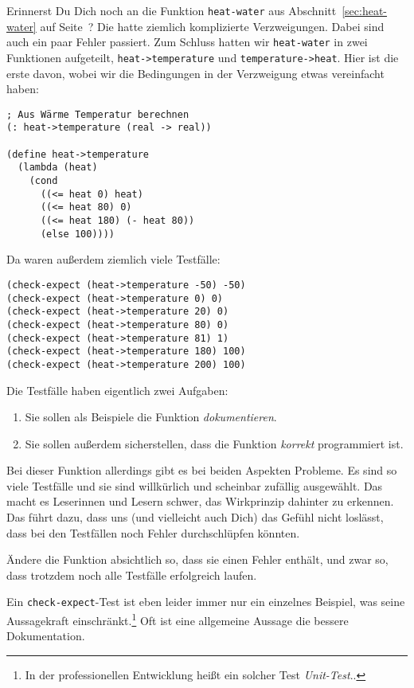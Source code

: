 Erinnerst Du Dich noch an die Funktion \lstinline{heat-water} aus
Abschnitt~\ref{sec:heat-water} auf Seite~\pageref{sec:heat-water}?
Die hatte ziemlich komplizierte Verzweigungen.  Dabei sind auch ein
paar Fehler passiert.  Zum Schluss hatten wir \lstinline{heat-water}
in zwei Funktionen aufgeteilt, \lstinline{heat->temperature} und
\lstinline{temperature->heat}.  Hier ist die erste davon, wobei wir
die Bedingungen in der Verzweigung etwas vereinfacht haben:
%
\begin{lstlisting}
; Aus Wärme Temperatur berechnen
(: heat->temperature (real -> real))

(define heat->temperature
  (lambda (heat)
    (cond
      ((<= heat 0) heat)
      ((<= heat 80) 0)
      ((<= heat 180) (- heat 80))
      (else 100))))
\end{lstlisting}
%
Da waren außerdem ziemlich viele Testfälle:
%
\begin{lstlisting}
(check-expect (heat->temperature -50) -50)
(check-expect (heat->temperature 0) 0)
(check-expect (heat->temperature 20) 0)
(check-expect (heat->temperature 80) 0)
(check-expect (heat->temperature 81) 1)
(check-expect (heat->temperature 180) 100)
(check-expect (heat->temperature 200) 100)                                            
\end{lstlisting}
%
Die Testfälle haben eigentlich zwei Aufgaben:
%
\begin{enumerate}
\item Sie sollen als Beispiele die Funktion \emph{dokumentieren}.
\item Sie sollen außerdem sicherstellen, dass die Funktion
  \emph{korrekt} programmiert ist.
\end{enumerate}
%
Bei dieser Funktion allerdings gibt es bei beiden Aspekten Probleme.
Es sind so viele Testfälle und sie sind willkürlich und scheinbar
zufällig ausgewählt.  Das macht es Leserinnen und Lesern schwer, das
Wirkprinzip dahinter zu erkennen. Das führt dazu, dass uns (und
vielleicht auch Dich) das Gefühl nicht loslässt, dass bei den
Testfällen noch Fehler durchschlüpfen könnten.
%
\begin{aufgabeinline}
  Ändere die Funktion absichtlich so, dass sie einen Fehler enthält,
  und zwar so, dass trotzdem noch alle Testfälle erfolgreich laufen.  
\end{aufgabeinline}
%
Ein \lstinline{check-expect}-Test ist eben leider immer nur ein
einzelnes Beispiel, was seine Aussagekraft einschränkt.\footnote{In
  der professionellen Entwicklung heißt ein solcher Test
  \textit{Unit-Test}..}  Oft ist eine allgemeine
Aussage die bessere Dokumentation.

